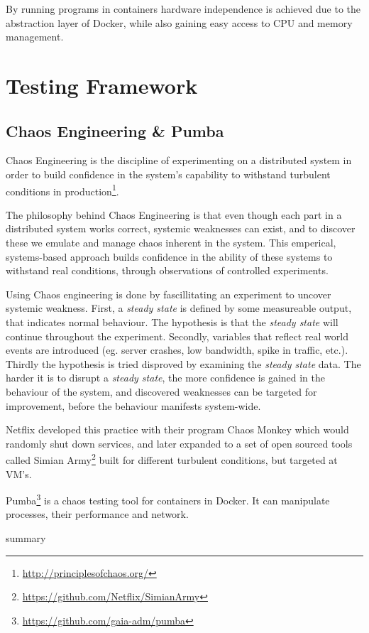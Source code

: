 By running programs in containers hardware independence is achieved due to the abstraction layer of Docker, while also gaining easy access to CPU and memory management.

\section{Testing Framework}
\subsection{Chaos Engineering \& Pumba}
Chaos Engineering is the discipline of experimenting on a distributed system in order to build confidence in the system’s capability to withstand turbulent conditions in production\footnote{\url{http://principlesofchaos.org/}}.

The philosophy behind Chaos Engineering is that even though each part in a distributed system works correct, systemic weaknesses can exist, and to discover these we emulate and manage chaos inherent in the system. This emperical, systems-based approach builds confidence in the ability of these systems to withstand real conditions, through observations of controlled experiments.

Using Chaos engineering is done by fascillitating an experiment to uncover systemic weakness.
First, a \emph{steady state} is defined by some measureable output, that indicates normal behaviour. The hypothesis is that the \emph{steady state} will continue throughout the experiment.
Secondly, variables that reflect real world events are introduced (eg. server crashes, low bandwidth, spike in traffic, etc.).
Thirdly the hypothesis is tried disproved by examining the \emph{steady state} data.
The harder it is to disrupt a \emph{steady state}, the more confidence is gained in the behaviour of the system, and discovered weaknesses can be targeted for improvement, before the behaviour manifests system-wide.

Netflix developed this practice with their program Chaos Monkey which would randomly shut down services, and later expanded to a set of open sourced tools called Simian Army\footnote{\url{https://github.com/Netflix/SimianArmy}} built for different turbulent conditions, but targeted at \acs{VM}'s.

Pumba\footnote{\url{https://github.com/gaia-adm/pumba}} is a chaos testing tool for containers in Docker. It can manipulate processes, their performance and network.

summary


